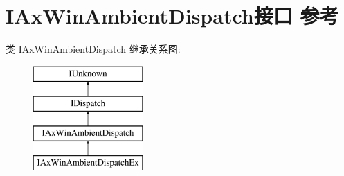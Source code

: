 \hypertarget{interface_i_ax_win_ambient_dispatch}{}\section{I\+Ax\+Win\+Ambient\+Dispatch接口 参考}
\label{interface_i_ax_win_ambient_dispatch}
类 I\+Ax\+Win\+Ambient\+Dispatch 继承关系图\+:\begin{figure}[H]
\begin{center}
\leavevmode
\includegraphics[height=4.000000cm]{interface_i_ax_win_ambient_dispatch}
\end{center}
\end{figure}
